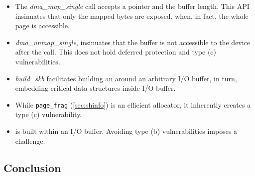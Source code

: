     \begin{itemize}[wide, labelwidth=!, labelindent=3pt]
        \item The \textit{dma\_map\_single} call accepts a pointer and the buffer length. This API insinuates that only the mapped bytes are exposed, when, in fact, the whole page is accessible.
        \item \textit{dma\_unmap\_single}, insinuates that the buffer is not accessible to the device after the call. This does not hold \DIFdelbegin {}\DIFdelend \DIFaddbegin {}\DIFaddend deferred protection and type (c) \subpage{} vulnerabilities.
        \item \textit{build\_skb} facilitates building an \skb{} around an arbitrary I/O buffer, in turn, embedding critical data structures inside \DIFdelbegin {}\DIFdelend \DIFaddbegin {}\DIFaddend I/O buffer.
        \item While \texttt{page\_frag} (\DIFdelbegin {}\DIFdelend \DIFaddbegin {}\DIFaddend \ref{sec:shinfo}) is an efficient allocator, it inherently creates a type (c) \subpage{} vulnerability.
            \item \DIFaddbegin {}\DIFaddend \shinfo{} is \DIFdelbegin {}\DIFdelend built within an I/O buffer. Avoiding type (b) \subpage{} vulnerabilities imposes a challenge.
    \end{itemize}


\subsection{Conclusion}\label{sec:Conclusion}





